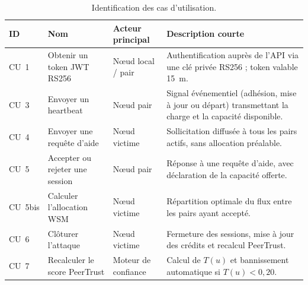 \begin{table}[H]
\centering
\caption{Identification des cas d'utilisation.}
\label{tab:cu_identification}

\renewcommand{\arraystretch}{1.8}
\setlength{\tabcolsep}{5pt}

\begin{tabular}{|
>{\raggedright\arraybackslash}p{1.2cm}|
>{\raggedright\arraybackslash}p{3.5cm}|
>{\raggedright\arraybackslash}p{3.0cm}|
>{\raggedright\arraybackslash}p{5.0cm}|}
\hline

\textbf{ID} &
\textbf{Nom} &
\textbf{Acteur principal} &
\textbf{Description courte} \\
\hline

CU~1 &
Obtenir un token JWT RS256 &
Nœud local / pair &
Authentification auprès de l'API via une clé privée RS256 ; token valable 15~m. \\
\hline

CU~3 &
Envoyer un heartbeat &
Nœud pair &
Signal événementiel (adhésion, mise à jour ou départ) transmettant la charge et la capacité disponible. \\
\hline

CU~4 &
Envoyer une requête d'aide &
Nœud victime &
Sollicitation diffusée à tous les pairs actifs, sans allocation préalable. \\
\hline

CU~5 &
Accepter ou rejeter une session &
Nœud pair &
Réponse à une requête d'aide, avec déclaration de la capacité offerte. \\
\hline

CU~5bis &
Calculer l'allocation WSM &
Nœud victime &
Répartition optimale du flux entre les pairs ayant accepté. \\
\hline

CU~6 &
Clôturer l'attaque &
Nœud victime &
Fermeture des sessions, mise à jour des crédits et recalcul PeerTrust. \\
\hline

CU~7 &
Recalculer le score PeerTrust &
Moteur de confiance &
Calcul de $T(u)$ et bannissement automatique si $T(u) < 0{,}20$. \\
\hline

\end{tabular}

\end{table}



